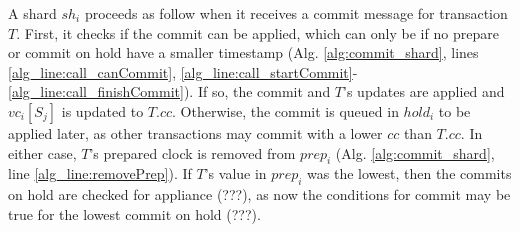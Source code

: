 \documentclass{vldb}
\begin{document}
A shard $\mathit{sh}_i$ proceeds as follow when it receives a commit message for transaction $T$.
First, it checks if the commit can be applied, which can only be if no prepare or commit on hold have a smaller timestamp (Alg. \ref{alg:commit_shard}, lines \ref{alg_line:call_canCommit}, \ref{alg_line:call_startCommit}-\ref{alg_line:call_finishCommit}).
If so, the commit and $T$'s updates are applied and $\mathit{vc}_i[S_j]$ is updated to $T\!.\mathit{cc}$.
Otherwise, the commit is queued in $\mathit{hold}_i$ to be applied later, as other transactions may commit with a lower $\mathit{cc}$ than $T\!.\mathit{cc}$.
In either case, $T$'s prepared clock is removed from $\mathit{prep}_i$ (Alg. \ref{alg:commit_shard}, line \ref{alg_line:removePrep}). 
If $T$'s value in $prep_i$ was the lowest, then the commits on hold are checked for appliance (???), as now the conditions for commit may be true for the lowest commit on hold (???).


\end{document}

